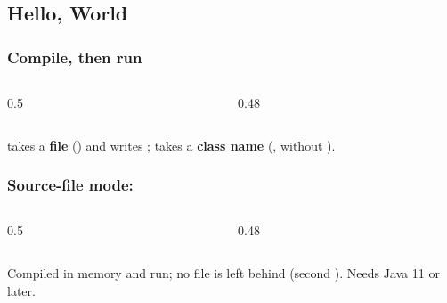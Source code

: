 \documentclass[aspectratio=169,10pt,compress]{beamer}
\begin{document}

\subsection[Hello]{Hello, World}




\begin{frame}[t,fragile] \frametitle{Compile, then run}
  \begin{columns}[T]
    \begin{column}{0.5\textwidth}
    \end{column}
    \begin{column}{0.48\textwidth}
    \end{column}
  \end{columns}

  \vspace{0.1em}
  \small {} takes a \textbf{file} () and writes ;  takes a
  \textbf{class name} (, without ).
\end{frame}




\begin{frame}[t,fragile] \frametitle{Source-file mode: }
  \begin{columns}[T]
    \begin{column}{0.5\textwidth}
    \end{column}
    \begin{column}{0.48\textwidth}
    \end{column}
  \end{columns}

  \vspace{0.1em}
  \small Compiled in memory and run; no  file is left behind (second ). Needs Java 11 or later.
\end{frame}
\end{document}

